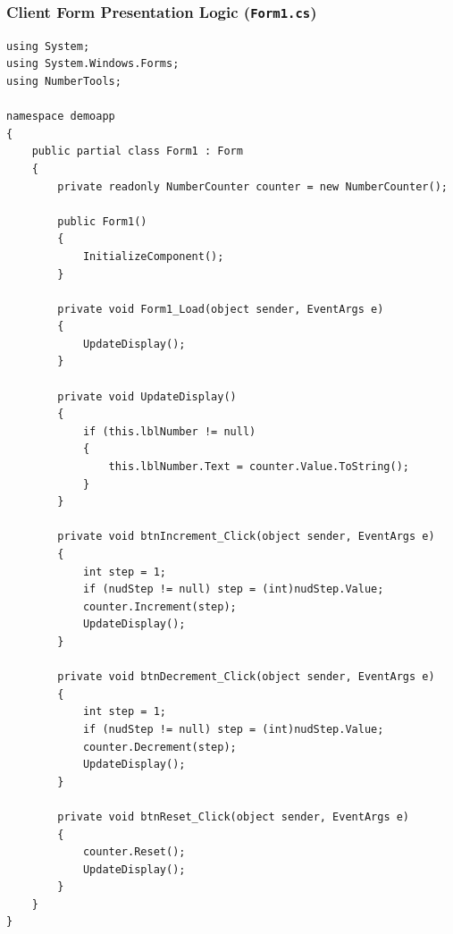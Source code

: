 \documentclass[11pt,a4paper]{article}
\begin{document}
\subsubsection{Client Form Presentation Logic (\texttt{Form1.cs})}
\begin{lstlisting}[language={[Sharp]C}, caption={\texttt{Form1.cs} Event Handling and Presentation Logic}, label={lst:form1}]
using System;
using System.Windows.Forms;
using NumberTools;

namespace demoapp
{
    public partial class Form1 : Form
    {
        private readonly NumberCounter counter = new NumberCounter();

        public Form1()
        {
            InitializeComponent();
        }

        private void Form1_Load(object sender, EventArgs e)
        {
            UpdateDisplay();
        }

        private void UpdateDisplay()
        {
            if (this.lblNumber != null)
            {
                this.lblNumber.Text = counter.Value.ToString();
            }
        }

        private void btnIncrement_Click(object sender, EventArgs e)
        {
            int step = 1;
            if (nudStep != null) step = (int)nudStep.Value;
            counter.Increment(step);
            UpdateDisplay();
        }

        private void btnDecrement_Click(object sender, EventArgs e)
        {
            int step = 1;
            if (nudStep != null) step = (int)nudStep.Value;
            counter.Decrement(step);
            UpdateDisplay();
        }

        private void btnReset_Click(object sender, EventArgs e)
        {
            counter.Reset();
            UpdateDisplay();
        }
    }
}
\end{lstlisting}
\end{document}
